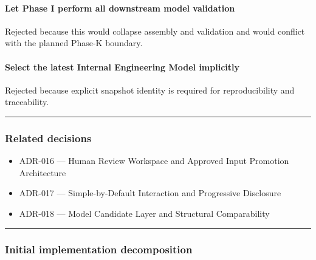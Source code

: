 \hypertarget{let-phase-i-perform-all-downstream-model-validation}{%
\paragraph{Let Phase I perform all downstream model validation}\label{let-phase-i-perform-all-downstream-model-validation}}

Rejected because this would collapse assembly and validation and would conflict with the planned Phase-K boundary.

\hypertarget{select-the-latest-internal-engineering-model-implicitly}{%
\paragraph{Select the latest Internal Engineering Model implicitly}\label{select-the-latest-internal-engineering-model-implicitly}}

Rejected because explicit snapshot identity is required for reproducibility and traceability.

\begin{center}\rule{0.5\linewidth}{0.5pt}\end{center}

\hypertarget{related-decisions-1}{%
\subsubsection{Related decisions}\label{related-decisions-1}}

\begin{itemize}
\tightlist
\item
  ADR-016 --- Human Review Workspace and Approved Input Promotion Architecture
\item
  ADR-017 --- Simple-by-Default Interaction and Progressive Disclosure
\item
  ADR-018 --- Model Candidate Layer and Structural Comparability
\end{itemize}

\begin{center}\rule{0.5\linewidth}{0.5pt}\end{center}

\hypertarget{initial-implementation-decomposition}{%
\subsubsection{Initial implementation decomposition}\label{initial-implementation-decomposition}}

